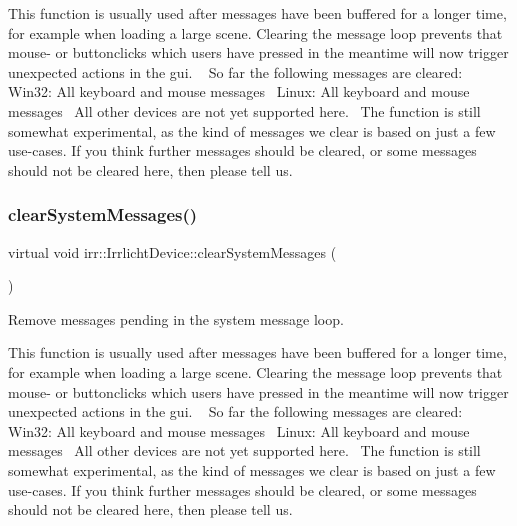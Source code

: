 This function is usually used after messages have been buffered for a longer time, for example when loading a large scene. Clearing the message loop prevents that mouse-\/ or buttonclicks which users have pressed in the meantime will now trigger unexpected actions in the gui. ~\newline
 So far the following messages are cleared\+:~\newline
 Win32\+: All keyboard and mouse messages~\newline
 Linux\+: All keyboard and mouse messages~\newline
 All other devices are not yet supported here.~\newline
 The function is still somewhat experimental, as the kind of messages we clear is based on just a few use-\/cases. If you think further messages should be cleared, or some messages should not be cleared here, then please tell us. \mbox{\label{classirr_1_1IrrlichtDevice_aa10c6151a267d8a1500d5dc7b44425dd}} 
\subsubsection{\texorpdfstring{clear\+System\+Messages()}{clearSystemMessages()}\hspace{0.1cm}{\footnotesize\ttfamily [3/3]}}
{\footnotesize\ttfamily virtual void irr\+::\+Irrlicht\+Device\+::clear\+System\+Messages (\begin{DoxyParamCaption}{ }\end{DoxyParamCaption})\hspace{0.3cm}{\ttfamily [pure virtual]}}



Remove messages pending in the system message loop. 

This function is usually used after messages have been buffered for a longer time, for example when loading a large scene. Clearing the message loop prevents that mouse-\/ or buttonclicks which users have pressed in the meantime will now trigger unexpected actions in the gui. ~\newline
 So far the following messages are cleared\+:~\newline
 Win32\+: All keyboard and mouse messages~\newline
 Linux\+: All keyboard and mouse messages~\newline
 All other devices are not yet supported here.~\newline
 The function is still somewhat experimental, as the kind of messages we clear is based on just a few use-\/cases. If you think further messages should be cleared, or some messages should not be cleared here, then please tell us. \mbox{\label{classirr_1_1IrrlichtDevice_a08c97937e0f60f98d443b397a7c60e18}} 
